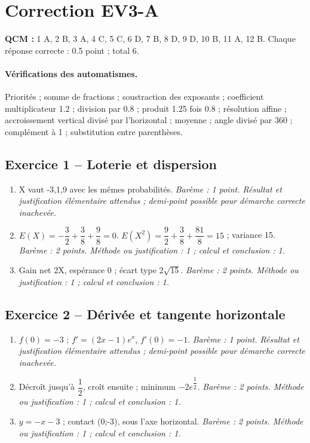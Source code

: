\mxnewpage\section*{Correction EV3-A}\label{EV3-A-CORR}
\textbf{QCM :} 1 A, 2 B, 3 A, 4 C, 5 C, 6 D, 7 B, 8 D, 9 D, 10 B, 11 A, 12 B. Chaque réponse correcte : \num{0,5} point ; total 6.
\paragraph{Vérifications des automatismes.} Priorités ; somme de fractions ; soustraction des exposants ; coefficient multiplicateur \num{1,2} ; division par \num{0,8} ; produit \num{1,25} fois \num{0,8} ; résolution affine ; accroissement vertical divisé par l’horizontal ; moyenne ; angle divisé par 360 ; complément à 1 ; substitution entre parenthèses.
\subsection*{Exercice 1 -- Loterie et dispersion}
\begin{enumerate}
\item X vaut -3,1,9 avec les mêmes probabilités. \textit{Barème : 1 point. Résultat et justification élémentaire attendus ; demi-point possible pour démarche correcte inachevée.}
\item $E(X)=-\dfrac{3}{2}+\dfrac{3}{8}+\dfrac{9}{8}=0$. $E(X^2)=\dfrac{9}{2}+\dfrac{3}{8}+\dfrac{81}{8}=15$ ; variance 15. \textit{Barème : 2 points. Méthode ou justification : 1 ; calcul et conclusion : 1.}
\item Gain net 2X, espérance 0 ; écart type $2\sqrt{15}$. \textit{Barème : 2 points. Méthode ou justification : 1 ; calcul et conclusion : 1.}
\end{enumerate}
\subsection*{Exercice 2 -- Dérivée et tangente horizontale}
\begin{enumerate}
\item $f(0)=-3$ ; $f\prime=(2x-1)e^x$, $f\prime(0)=-1$. \textit{Barème : 1 point. Résultat et justification élémentaire attendus ; demi-point possible pour démarche correcte inachevée.}
\item Décroît jusqu’à $\dfrac{1}{2}$, croît ensuite ; minimum $-2e^{\dfrac{1}{2}}$. \textit{Barème : 2 points. Méthode ou justification : 1 ; calcul et conclusion : 1.}
\item $y=-x-3$ ; contact (0;-3), sous l’axe horizontal. \textit{Barème : 2 points. Méthode ou justification : 1 ; calcul et conclusion : 1.}
\end{enumerate}

